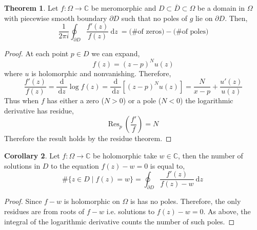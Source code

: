 \documentclass{article}
\newcommand{\C}{\mathbb{C}}
\renewcommand{\d}[1]{\: \mathrm{d}#1 \:}
\newcommand{\deriv}[2]{\frac{\d{#1}}{\d{#2}}}
\theoremstyle{definition}
\newtheorem{theorem}{Theorem}[section]
\newtheorem{corollary}[theorem]{Corollary}
\newcommand{\Res}[2]{\mathrm{Res}_{#1} \: #2}
\begin{document}
\begin{theorem}
Let $f : \Omega \to \C$ be meromorphic and $D \subset \overline{D} \subset \Omega$ be a domain in $\Omega$ with piecewise smooth boundary $\partial D$ such that no poles of $g$ lie on $\partial D$. Then,
\[ 
\frac{1}{2 \pi i} \oint_{\partial D} \frac{f'(z)}{f(z)} \d{z} = \text{(\# of zeros)} - \text{(\# of poles)}
\]
\end{theorem}

\begin{proof}
At each point $p \in D$ we can expand,
\[ f(z) = (z - p)^N u(z) \]
where $u$ is holomorphic and nonvanishing. Therefore,
\[ \frac{f'(z)}{f(z)} = \deriv{}{z} \log{f(z)} = \deriv{}{z} \left[ (z - p)^N u(z) \right] = \frac{N}{x - p} + \frac{u'(z)}{u(z)} \]
Thus when $f$ has either a zero ($N > 0$) or a pole ($N < 0$) the logarithmic derivative has residue,
\[ \Res{p}{\left(\frac{f'}{f}\right)} = N \]
Therefore the result holds by the residue theorem. 
\end{proof}

\begin{corollary}
Let $f : \Omega \to \C$ be holomorphic take $w \in \C$, then the number of solutions in $D$ to the equation $f(z) - w = 0$ is equal to,
\[ \#\{ z \in D \mid f(z) = w \} = \oint_{\partial D} \frac{f'(z)}{f(z) - w} \d{z}  \]
\end{corollary}

\begin{proof}
Since $f - w$ is holomorphic on $\Omega$ is has no poles. Therefore, the only residues are from roots of $f - w$ i.e. solutions to $f(z) - w = 0$. As above, the integral of the logarithmic derivative counts the number of such poles.  
\end{proof}
\end{document}
